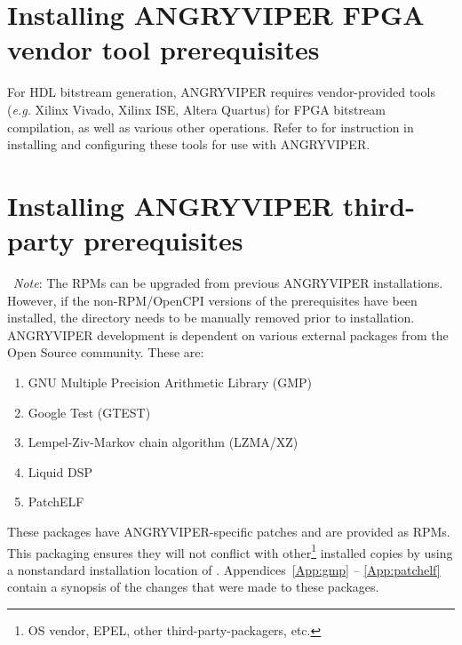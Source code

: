 

\section{Installing ANGRYVIPER FPGA vendor tool prerequisites}
\label{sec:installing_fpga_vendor_prereq}
For HDL bitstream generation, ANGRYVIPER requires vendor-provided tools (\textit{e.g.} Xilinx Vivado, Xilinx ISE, Altera Quartus) for FPGA bitstream compilation, as well as various other operations. Refer to  for instruction in installing and configuring these tools for use with ANGRYVIPER.

\section{Installing ANGRYVIPER third-party prerequisites}
\label{sec:installing_prereq}
\textbullet\ \textit{Note}: The RPMs can be upgraded from previous ANGRYVIPER installations. However, if the non-RPM/OpenCPI versions of the prerequisites have been installed, the  directory needs to be manually removed prior to installation.\\

ANGRYVIPER development is dependent on various external packages from the Open Source community. These are:
	\begin{enumerate}
		\item GNU Multiple Precision Arithmetic Library (GMP)
		\item Google Test (GTEST)
		\item Lempel-Ziv-Markov chain algorithm (LZMA/XZ)
		\item Liquid DSP
		\item PatchELF
	\end{enumerate}
These packages have ANGRYVIPER-specific patches and are provided as RPMs. This packaging ensures they will not conflict with other\footnote{OS vendor, EPEL, other third-party-packagers, etc.} installed copies by using a nonstandard installation location of . Appendices~\ref{App:gmp} -- \ref{App:patchelf} contain a synopsis of the changes that were made to these packages.\\

